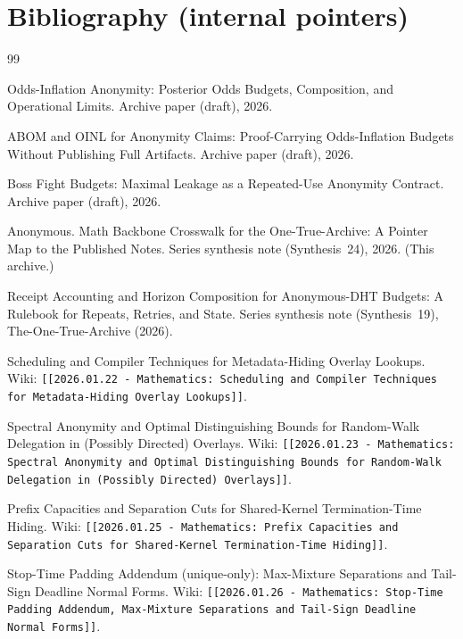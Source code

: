 \documentclass[11pt]{article}
\begin{document}
\section{Bibliography (internal pointers)}
\begin{thebibliography}{99}

Odds-Inflation Anonymity: Posterior Odds Budgets, Composition, and Operational Limits.
\newblock Archive paper (draft), 2026.

ABOM and OINL for Anonymity Claims: Proof-Carrying Odds-Inflation Budgets Without Publishing Full Artifacts.
\newblock Archive paper (draft), 2026.

Boss Fight Budgets: Maximal Leakage as a Repeated-Use Anonymity Contract.
\newblock Archive paper (draft), 2026.

Anonymous.
\newblock Math Backbone Crosswalk for the One-True-Archive: A Pointer Map to the Published Notes.
\newblock Series synthesis note (Synthesis~24), 2026. (This archive.)

Receipt Accounting and Horizon Composition for Anonymous-DHT Budgets: A Rulebook for Repeats, Retries, and State.
\newblock Series synthesis note (Synthesis~19), The-One-True-Archive (2026).

Scheduling and Compiler Techniques for Metadata-Hiding Overlay Lookups.
\newblock Wiki: \texttt{[[2026.01.22 - Mathematics: Scheduling and Compiler Techniques for Metadata-Hiding Overlay Lookups]]}.

Spectral Anonymity and Optimal Distinguishing Bounds for Random-Walk Delegation in (Possibly Directed) Overlays.
\newblock Wiki: \texttt{[[2026.01.23 - Mathematics: Spectral Anonymity and Optimal Distinguishing Bounds for Random-Walk Delegation in (Possibly Directed) Overlays]]}.

Prefix Capacities and Separation Cuts for Shared-Kernel Termination-Time Hiding.
\newblock Wiki: \texttt{[[2026.01.25 - Mathematics: Prefix Capacities and Separation Cuts for Shared-Kernel Termination-Time Hiding]]}.

Stop-Time Padding Addendum (unique-only): Max-Mixture Separations and Tail-Sign Deadline Normal Forms.
\newblock Wiki: \texttt{[[2026.01.26 - Mathematics: Stop-Time Padding Addendum, Max-Mixture Separations and Tail-Sign Deadline Normal Forms]]}.


\end{thebibliography}
\end{document}
